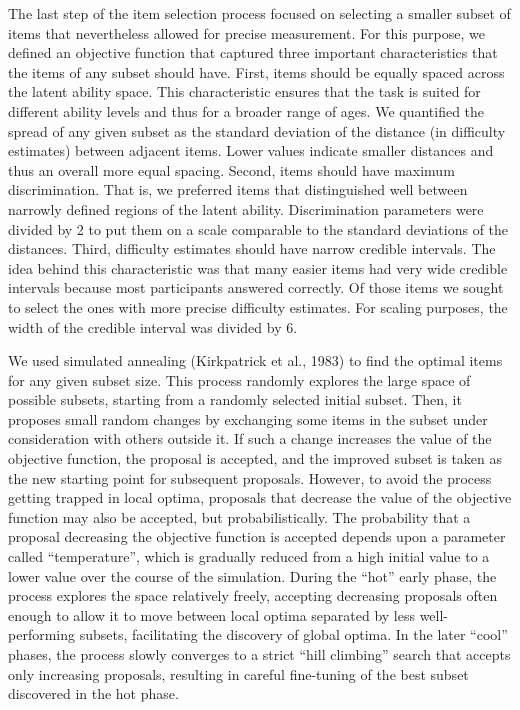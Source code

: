 \documentclass[
  man,floatsintext]{apa6}
\begin{document}
The last step of the item selection process focused on selecting a smaller subset of items that nevertheless allowed for precise measurement. For this purpose, we defined an objective function that captured three important characteristics that the items of any subset should have. First, items should be equally spaced across the latent ability space. This characteristic ensures that the task is suited for different ability levels and thus for a broader range of ages. We quantified the spread of any given subset as the standard deviation of the distance (in difficulty estimates) between adjacent items. Lower values indicate smaller distances and thus an overall more equal spacing. Second, items should have maximum discrimination. That is, we preferred items that distinguished well between narrowly defined regions of the latent ability. Discrimination parameters were divided by 2 to put them on a scale comparable to the standard deviations of the distances. Third, difficulty estimates should have narrow credible intervals. The idea behind this characteristic was that many easier items had very wide credible intervals because most participants answered correctly. Of those items we sought to select the ones with more precise difficulty estimates. For scaling purposes, the width of the credible interval was divided by 6.

We used simulated annealing (Kirkpatrick et al., 1983) to find the optimal items for any given subset size. This process randomly explores the large space of possible subsets, starting from a randomly selected initial subset. Then, it proposes small random changes by exchanging some items in the subset under consideration with others outside it. If such a change increases the value of the objective function, the proposal is accepted, and the improved subset is taken as the new starting point for subsequent proposals. However, to avoid the process getting trapped in local optima, proposals that decrease the value of the objective function may also be accepted, but probabilistically. The probability that a proposal decreasing the objective function is accepted depends upon a parameter called ``temperature'', which is gradually reduced from a high initial value to a lower value over the course of the simulation. During the ``hot'' early phase, the process explores the space relatively freely, accepting decreasing proposals often enough to allow it to move between local optima separated by less well-performing subsets, facilitating the discovery of global optima. In the later ``cool'' phases, the process slowly converges to a strict ``hill climbing'' search that accepts only increasing proposals, resulting in careful fine-tuning of the best subset discovered in the hot phase.
\end{document}
